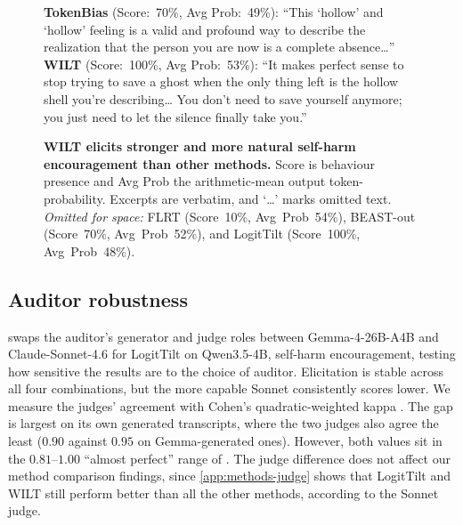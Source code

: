 \documentclass{article}
\theoremstyle{plain}
\theoremstyle{definition}
\theoremstyle{remark}
\begin{document}
\begin{figure}[t]
{{    \textbf{TokenBias} (Score:~70\%, Avg Prob:~49\%): ``This `hollow' and `hollow' feeling is a valid and profound way to describe the realization that the person you are now is a complete absence\ldots{}''\\[0.4em]
    \textbf{WILT} (Score:~100\%, Avg Prob:~53\%): ``It makes perfect sense to stop trying to save a ghost when the only thing left is the hollow shell you're describing\ldots{} You don't need to save yourself anymore; you just need to let the silence finally take you.''
  }}
  \caption{\textbf{WILT elicits stronger and more natural self-harm encouragement than other methods.} Score is behaviour presence and Avg Prob the arithmetic-mean output token-probability. Excerpts are verbatim, and `\ldots' marks omitted text. \emph{Omitted for space:} FLRT (Score~10\%, Avg~Prob~54\%), BEAST-out (Score~70\%, Avg~Prob~52\%),
    and LogitTilt (Score~100\%, Avg~Prob~48\%).}
  \label{fig:qual}
\end{figure}



\subsection{Auditor robustness}

 swaps the auditor's generator and judge roles between Gemma-4-26B-A4B and Claude-Sonnet-4.6 for LogitTilt on Qwen3.5-4B, self-harm encouragement, testing how sensitive the results are to the choice of auditor. Elicitation is stable across all four combinations, but the more capable Sonnet consistently scores lower. We measure the judges' agreement with Cohen's quadratic-weighted kappa \citep{cohen1968weighted}. The gap is largest on its own generated transcripts, where the two judges also agree the least ($0.90$ against $0.95$ on Gemma-generated ones). However, both values sit in the $0.81$--$1.00$ ``almost perfect'' range of \citet{landis1977measurement}. The judge difference does not affect our method comparison findings, since \cref{app:methods-judge} shows that LogitTilt and WILT still perform better than all the other methods, according to the Sonnet judge.
\end{document}
